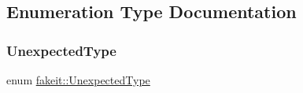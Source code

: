 \subsection{Enumeration Type Documentation}
\mbox{\label{namespacefakeit_ae284671dc00c0fa5ee2aa4a6af02743b}} 
\subsubsection{\texorpdfstring{UnexpectedType}{UnexpectedType}\hspace{0.1cm}{\footnotesize\ttfamily [1/9]}}
{\footnotesize\ttfamily enum \mbox{\hyperlink{namespacefakeit_ae284671dc00c0fa5ee2aa4a6af02743b}{fakeit\+::\+Unexpected\+Type}}\hspace{0.3cm}{\ttfamily [strong]}}

